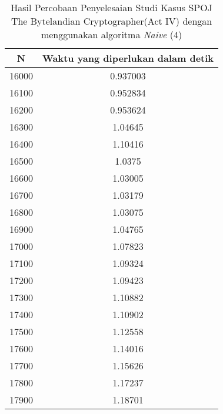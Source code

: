 \begin{table}[H]
\centering
\begin{tabular}{|c|c|}\hline
N&Waktu yang diperlukan dalam detik\\ \hline
16000&0.937003\\ \hline
16100&0.952834\\ \hline
16200&0.953624\\ \hline
16300&1.04645\\ \hline
16400&1.10416\\ \hline
16500&1.0375\\ \hline
16600&1.03005\\ \hline
16700&1.03179\\ \hline
16800&1.03075\\ \hline
16900&1.04765\\ \hline
17000&1.07823\\ \hline
17100&1.09324\\ \hline
17200&1.09423\\ \hline
17300&1.10882\\ \hline
17400&1.10902\\ \hline
17500&1.12558\\ \hline
17600&1.14016\\ \hline
17700&1.15626\\ \hline
17800&1.17237\\ \hline
17900&1.18701\\ \hline
\end{tabular}
\caption {Hasil Percobaan Penyelesaian Studi Kasus SPOJ The Bytelandian Cryptographer(Act IV) dengan menggunakan algoritma \textit{Naive} (4)}
\label{tab:1res8}
\end{table}

